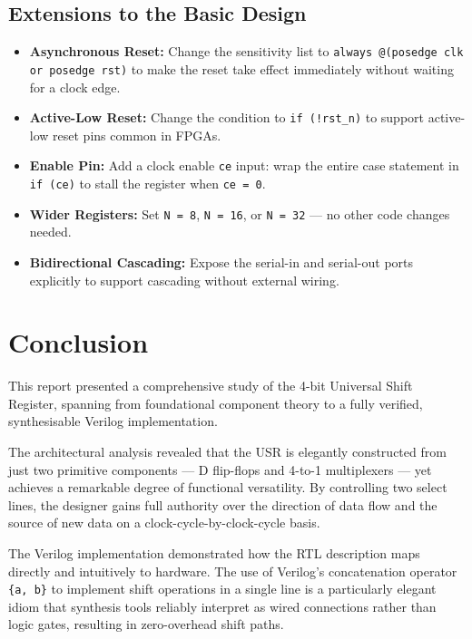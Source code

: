 \documentclass[12pt,a4paper]{report}
\begin{document}
\section{Extensions to the Basic Design}

\begin{itemize}
    \item \textbf{Asynchronous Reset:} Change the sensitivity list to \texttt{always @(posedge clk or posedge rst)} to make the reset take effect immediately without waiting for a clock edge.
    \item \textbf{Active-Low Reset:} Change the condition to \texttt{if (!rst\_n)} to support active-low reset pins common in FPGAs.
    \item \textbf{Enable Pin:} Add a clock enable \texttt{ce} input: wrap the entire case statement in \texttt{if (ce)} to stall the register when \texttt{ce = 0}.
    \item \textbf{Wider Registers:} Set \texttt{N = 8}, \texttt{N = 16}, or \texttt{N = 32} — no other code changes needed.
    \item \textbf{Bidirectional Cascading:} Expose the serial-in and serial-out ports explicitly to support cascading without external wiring.
\end{itemize}

\chapter{Conclusion}

This report presented a comprehensive study of the 4-bit Universal Shift Register, spanning from foundational component theory to a fully verified, synthesisable Verilog implementation.

The architectural analysis revealed that the USR is elegantly constructed from just two primitive components — D flip-flops and 4-to-1 multiplexers — yet achieves a remarkable degree of functional versatility. By controlling two select lines, the designer gains full authority over the direction of data flow and the source of new data on a clock-cycle-by-clock-cycle basis.

The Verilog implementation demonstrated how the RTL description maps directly and intuitively to hardware. The use of Verilog's concatenation operator \texttt{\{a, b\}} to implement shift operations in a single line is a particularly elegant idiom that synthesis tools reliably interpret as wired connections rather than logic gates, resulting in zero-overhead shift paths.
\end{document}

